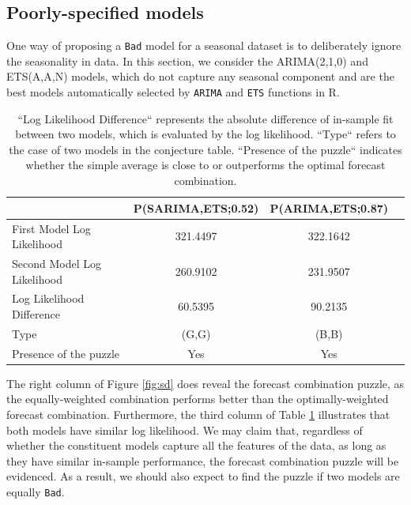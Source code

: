 \documentclass{monashthesis}
\begin{document}
\subsection*{Poorly-specified models}

One way of proposing a \texttt{Bad} model for a seasonal dataset is to deliberately ignore the seasonality in data. In this section, we consider the ARIMA(2,1,0) and ETS(A,A,N) models, which do not capture any seasonal component and are the best models automatically selected by \texttt{ARIMA} and \texttt{ETS} functions in R.

\begin{table}[ht]
  \centering
    \begin{tabular}{l|ccc}
    \toprule
                                      &   P(SARIMA,ETS;0.52)   &   P(ARIMA,ETS;0.87)  \\  
    \midrule
    First Model Log Likelihood        &         321.4497       &      322.1642        \\
    Second Model Log Likelihood       &         260.9102       &      231.9507        \\
    Log Likelihood Difference         &         60.5395        &      90.2135         \\
    Type                              &          (G,G)         &       (B,B)          \\
    Presence of the puzzle            &           Yes          &        Yes           \\
    \bottomrule
    \end{tabular}
  \caption{``Log Likelihood Difference`` represents the absolute difference of in-sample fit between two models, which is evaluated by the log likelihood. ``Type`` refers to the case of two models in the conjecture table. ``Presence of the puzzle`` indicates whether the simple average is close to or outperforms the optimal forecast combination.}
  \label{tab:season}
\end{table}

The right column of Figure \ref{fig:sd} does reveal the forecast combination puzzle, as the equally-weighted combination performs better than the optimally-weighted forecast combination. Furthermore, the third column of Table \ref{tab:season} illustrates that both models have similar log likelihood. We may claim that, regardless of whether the constituent models capture all the features of the data, as long as they have similar in-sample performance, the forecast combination puzzle will be evidenced. As a result, we should also expect to find the puzzle if two models are equally \texttt{Bad}.
\end{document}

